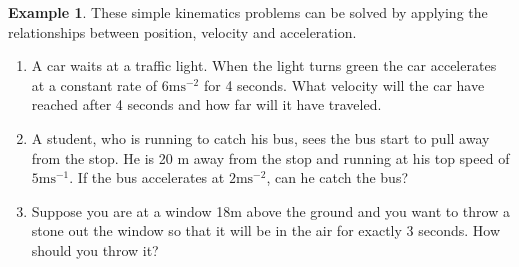 \documentclass[extrafontsizes, twoside, a4paper]{memoir}
\theoremstyle{plain}%
\theoremstyle{definition}
\newtheorem{exmp}{Example}[chapter]
\theoremstyle{remark}
\begin{document}
\begin{exmp}
These simple kinematics problems can be solved by applying the relationships between position, velocity and acceleration.
\begin{enumerate}
\item
A car waits at a traffic light. When the light turns green the car accelerates at a constant rate of $6\text{ms}^{-2}$ for 4 seconds. What velocity will the car have reached after 4 seconds and how far will it have traveled.
\item
A student, who is running to catch his bus, sees the bus start to pull away from the stop.  He is 20 m away from the stop and running at his top speed of $5\text{ms}^{-1}$.  If the bus accelerates at $2\text{ms}^{-2}$, can he catch the bus?
\item
Suppose you are at a window 18m above the ground and you want to throw a stone out the window so that it will be in the air for exactly 3 seconds. How should you throw it?
\end{enumerate}
\end{exmp}
\end{document}
